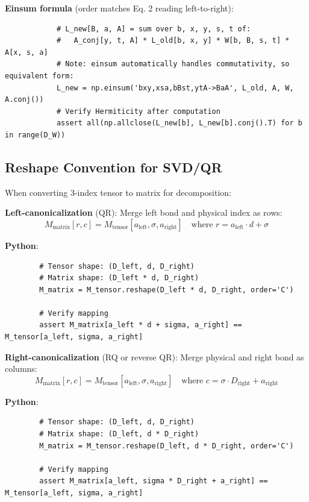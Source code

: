\documentclass[aps,prb,onecolumn,scriptaddress]{revtex4-2}
\begin{document}
		\textbf{Einsum formula} (order matches Eq. 2 reading left-to-right):
		\begin{verbatim}
			# L_new[B, a, A] = sum over b, x, y, s, t of:
			#   A_conj[y, t, A] * L_old[b, x, y] * W[b, B, s, t] * A[x, s, a]
			# Note: einsum automatically handles commutativity, so equivalent form:
			L_new = np.einsum('bxy,xsa,bBst,ytA->BaA', L_old, A, W, A.conj())
			# Verify Hermiticity after computation
			assert all(np.allclose(L_new[b], L_new[b].conj().T) for b in range(D_W))
		\end{verbatim}
		
		\subsection{Reshape Convention for SVD/QR}
		
		When converting 3-index tensor to matrix for decomposition:
		
		\textbf{Left-canonicalization} (QR): Merge left bond and physical index as rows:
		\begin{equation}
		\boxed{M_{\text{matrix}}[r, c] = M_{\text{tensor}}[a_{\text{left}}, \sigma, a_{\text{right}}] \quad \text{where } r = a_{\text{left}} \cdot d + \sigma}
		\end{equation}
		
		\textbf{Python}:
		\begin{verbatim}
		# Tensor shape: (D_left, d, D_right)
		# Matrix shape: (D_left * d, D_right)
		M_matrix = M_tensor.reshape(D_left * d, D_right, order='C')
		
		# Verify mapping
		assert M_matrix[a_left * d + sigma, a_right] == M_tensor[a_left, sigma, a_right]
		\end{verbatim}
		
		\textbf{Right-canonicalization} (RQ or reverse QR): Merge physical and right bond as columns:
		\begin{equation}
		\boxed{M_{\text{matrix}}[r, c] = M_{\text{tensor}}[a_{\text{left}}, \sigma, a_{\text{right}}] \quad \text{where } c = \sigma \cdot D_{\text{right}} + a_{\text{right}}}
		\end{equation}
		
		\textbf{Python}:
		\begin{verbatim}
		# Tensor shape: (D_left, d, D_right)
		# Matrix shape: (D_left, d * D_right)
		M_matrix = M_tensor.reshape(D_left, d * D_right, order='C')
		
		# Verify mapping
		assert M_matrix[a_left, sigma * D_right + a_right] == M_tensor[a_left, sigma, a_right]
		\end{verbatim}
		
\end{document}
